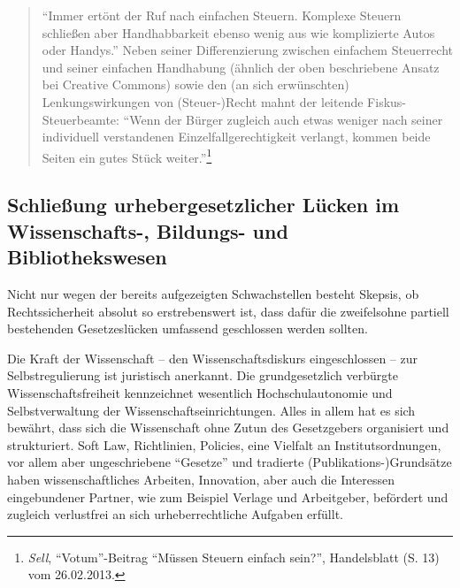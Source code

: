 \documentclass[output=paper]{langscibook}
\begin{document}
\begin{quote}
\enquote{Immer ertönt der Ruf nach einfachen Steuern. Komplexe Steuern
schließen aber Handhabbarkeit ebenso wenig aus wie komplizierte Autos
oder Handys.} Neben seiner Differenzierung zwischen einfachem
Steuerrecht und seiner einfachen Handhabung (ähnlich der oben
beschriebene Ansatz bei Creative Commons) sowie den (an sich
erwünschten) Lenkungswirkungen von (Steuer-)Recht mahnt der leitende
Fiskus-Steuerbeamte: \enquote{Wenn der Bürger zugleich auch etwas
weniger nach seiner individuell verstandenen Einzelfallgerechtigkeit
verlangt, kommen beide Seiten ein gutes Stück weiter.}\footnote{\emph{Sell},
  \enquote{Votum}-Beitrag \enquote{Müssen Steuern einfach sein?},
  Handelsblatt (S. 13) vom 26.02.2013.}
\end{quote}

\hypertarget{schlieuxdfung-urhebergesetzlicher-luxfccken-im-wissenschafts--bildungs--und-bibliothekswesen}{%
\subsection{Schließung urhebergesetzlicher Lücken im Wissenschafts-,
Bildungs- und
Bibliothekswesen}\label{schlieuxdfung-urhebergesetzlicher-luxfccken-im-wissenschafts--bildungs--und-bibliothekswesen}}

Nicht nur wegen der bereits aufgezeigten Schwachstellen besteht Skepsis,
ob Rechtssicherheit absolut so erstrebenswert ist, dass dafür die
zweifelsohne partiell bestehenden Gesetzeslücken umfassend geschlossen
werden sollten.

Die Kraft der Wissenschaft -- den Wissenschaftsdiskurs eingeschlossen --
zur Selbstregulierung ist juristisch anerkannt. Die grundgesetzlich
verbürgte Wissenschaftsfreiheit kennzeichnet wesentlich
Hochschulautonomie und Selbstverwaltung der Wissenschaftseinrichtungen.
Alles in allem hat es sich bewährt, dass sich die Wissenschaft ohne
Zutun des Gesetzgebers organisiert und strukturiert. Soft Law,
Richtlinien, Policies, eine Vielfalt an Institutsordnungen, vor allem
aber ungeschriebene \enquote{Gesetze} und tradierte
(Publikations-)Grundsätze haben wissenschaftliches Arbeiten, Innovation,
aber auch die Interessen eingebundener Partner, wie zum Beispiel Verlage
und Arbeitgeber, befördert und zugleich verlustfrei an sich
urheberrechtliche Aufgaben erfüllt.
\end{document}
